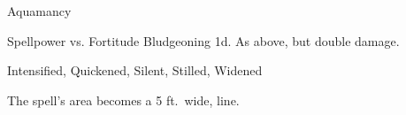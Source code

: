 \begin{spellsection}{Aquamancy}
\begin{spellheader}
\end{spellheader}
\begin{spellcontent}
\begin{spelltargetinginfo}
\end{spelltargetinginfo}
\begin{spelleffects}
\begin{spellattack}{Spellpower vs. Fortitude}
\spellsuccess Bludgeoning  \minus1d.
\spellcritical As above, but double damage.
\end{spellattack}
\end{spelleffects}
\end{spellcontent}
\begin{spellfooter}
 Intensified, Quickened, Silent, Stilled, Widened
\end{spellfooter}
\begin{spellsubcontent}
\begin{spellcantrip}
The spell's area becomes a 5 ft.\ wide, \areamed line.
\end{spellcantrip}
\end{spellsubcontent}
\end{spellsection}
